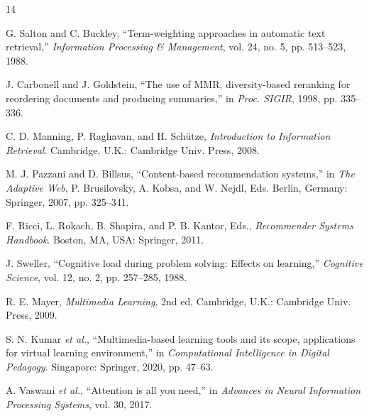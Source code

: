 \documentclass[10pt,journal,compsoc]{IEEEtran}
\begin{document}
%
%
%

\newpage
\begin{thebibliography}{14}

G. Salton and C. Buckley, ``Term-weighting approaches in automatic text retrieval,'' \emph{Information Processing \& Management}, vol. 24, no. 5, pp. 513--523, 1988.

J. Carbonell and J. Goldstein, ``The use of MMR, diversity-based reranking for reordering documents and producing summaries,'' in \emph{Proc. SIGIR}, 1998, pp. 335--336.

C. D. Manning, P. Raghavan, and H. Sch\"utze, \emph{Introduction to Information Retrieval}. Cambridge, U.K.: Cambridge Univ. Press, 2008.

M. J. Pazzani and D. Billsus, ``Content-based recommendation systems,'' in \emph{The Adaptive Web}, P. Brusilovsky, A. Kobsa, and W. Nejdl, Eds. Berlin, Germany: Springer, 2007, pp. 325--341.

F. Ricci, L. Rokach, B. Shapira, and P. B. Kantor, Eds., \emph{Recommender Systems Handbook}. Boston, MA, USA: Springer, 2011.

J. Sweller, ``Cognitive load during problem solving: Effects on learning,'' \emph{Cognitive Science}, vol. 12, no. 2, pp. 257--285, 1988.

R. E. Mayer, \emph{Multimedia Learning}, 2nd ed. Cambridge, U.K.: Cambridge Univ. Press, 2009.

S. N. Kumar \emph{et al.}, ``Multimedia-based learning tools and its scope, applications for virtual learning environment,'' in \emph{Computational Intelligence in Digital Pedagogy}. Singapore: Springer, 2020, pp. 47--63.

A. Vaswani \emph{et al.}, ``Attention is all you need,'' in \emph{Advances in Neural Information Processing Systems}, vol. 30, 2017.


\end{thebibliography}
\end{document}
